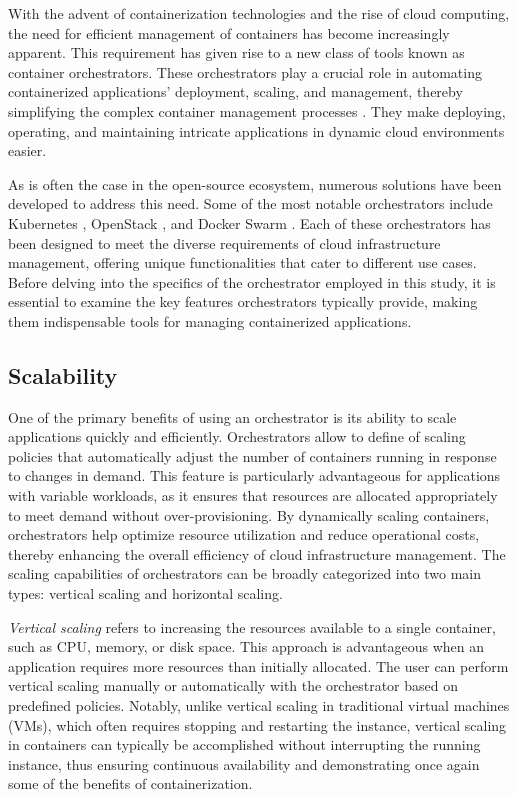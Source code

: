 With the advent of containerization technologies and the rise of cloud
computing, the need for efficient management of containers has become
increasingly apparent.
This requirement has given rise to a new class of tools known as container
orchestrators. These orchestrators play a crucial role in automating
containerized applications' deployment, scaling, and management, thereby
simplifying the complex container management processes \cite{Rodriguez2018}.
They make deploying, operating, and maintaining intricate applications in
dynamic cloud environments easier.

As is often the case in the open-source ecosystem, numerous solutions have been
developed to address this need.
Some of the most notable orchestrators include Kubernetes
\cite{bookofkubernetes}, OpenStack \cite{Lima2017}, and Docker Swarm
\cite{Singh2023}.
Each of these orchestrators has been designed to meet the diverse requirements
of cloud infrastructure management, offering unique functionalities that cater
to different use cases.
Before delving into the specifics of the orchestrator employed in this study, it
is essential to examine the key features orchestrators typically provide, making
them indispensable tools for managing containerized applications.

\subsection{Scalability}

One of the primary benefits of using an orchestrator is its ability to scale
applications quickly and efficiently.
Orchestrators allow to define of scaling policies that automatically adjust the
number of containers running in response to changes in demand.
This feature is particularly advantageous for applications with variable
workloads, as it ensures that resources are allocated appropriately to meet
demand without over-provisioning.
By dynamically scaling containers, orchestrators help optimize resource
utilization and reduce operational costs, thereby enhancing the overall
efficiency of cloud infrastructure management.
The scaling capabilities of orchestrators can be broadly categorized into two
main types: vertical scaling and horizontal scaling.

\textit{Vertical scaling} refers to increasing the resources available to a single
container, such as CPU, memory, or disk space.
This approach is advantageous when an application requires more resources than
initially allocated.
The user can perform vertical scaling manually or automatically with the
orchestrator based on predefined policies.
Notably, unlike vertical scaling in traditional virtual machines (VMs), which
often requires stopping and restarting the instance, vertical scaling in
containers can typically be accomplished without interrupting the running
instance, thus ensuring continuous availability and demonstrating once again
some of the benefits of containerization.

